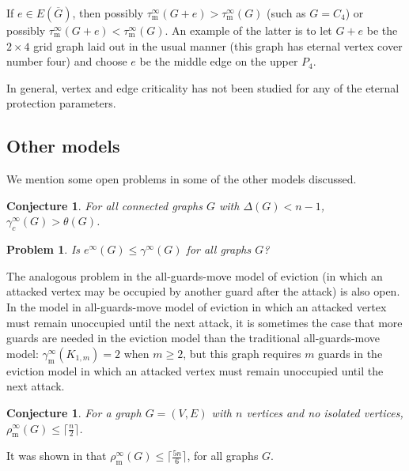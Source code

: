 \documentclass[12pt]{article}%
\newtheorem{conjecture}[theorem]{Conjecture}
\newtheorem{problem}[theorem]{Problem}
\begin{document}
If $e\in E(\overline{G})$, then possibly $\tau_{\mathrm{m}}^{\infty}%
(G+e)>\tau_{\mathrm{m}}^{\infty}(G)$ (such as $G=C_{4}$) or possibly
$\tau_{\mathrm{m}}^{\infty}(G+e)<\tau_{\mathrm{m}}^{\infty}(G)$. An example of
the latter is to let $G+e$ be the $2\times4$ grid graph laid out in the usual
manner (this graph has eternal vertex cover number four) and choose $e$ be the
middle edge on the upper $P_{4}$.

In general, vertex and edge criticality has not been studied for any of the
eternal protection parameters.

\subsection{Other models}

We mention some open problems in some of the other models discussed.

\begin{conjecture}
\emph{\cite{KM4}\hspace{0.1in}}For all connected graphs $G$ with
$\Delta(G)<n-1$, $\gamma_{c}^{\infty}(G)>\theta(G)$.
\end{conjecture}

\begin{problem}
\emph{\cite{KLM}\hspace{0.1in}}Is $e^{\infty}(G)\leq\gamma^{\infty}(G)$ for
all graphs $G$?
\end{problem}

The analogous problem in the all-guards-move model of eviction (in which an
attacked vertex may be occupied by another guard after the attack) is also
open. In the model in all-guards-move model of eviction in which an attacked
vertex must remain unoccupied until the next attack, it is sometimes the case
that more guards are needed in the eviction model than the traditional
all-guards-move model: $\gamma_{\mathrm{m}}^{\infty}(K_{1,m})=2$ when $m
\geq2$, but this graph requires $m$ guards in the eviction model in which an
attacked vertex must remain unoccupied until the next attack.

\begin{conjecture}
\emph{\cite{kmfool}\hspace{0.1in}}For a graph $G=(V,E)$ with $n$ vertices and
no isolated vertices, $\rho_{\mathrm{\operatorname{m}}}^{\infty}(G)\leq
\lceil\frac{n}{2}\rceil$.
\end{conjecture}

It was shown in \cite{kmfool} that $\rho_{\mathrm{\operatorname{m}}}^{\infty
}(G)\leq\lceil\frac{5n}{6}\rceil$, for all graphs $G$.
\end{document}
